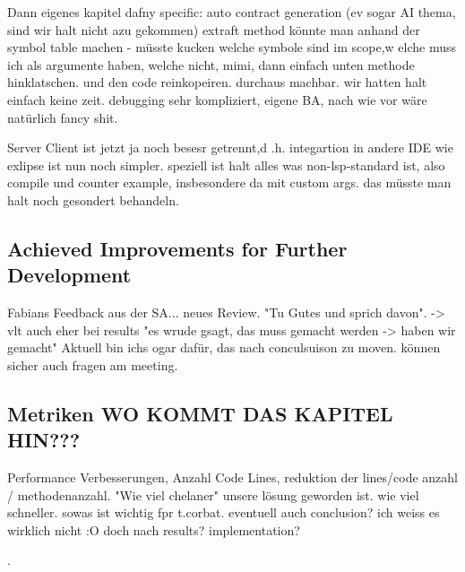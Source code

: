 Dann eigenes kapitel dafny specific:
auto contract generation (ev sogar AI thema, sind wir halt nicht azu gekommen)
extraft method könnte man anhand der symbol table machen - müsste kucken welche symbole sind im scope,w elche muss ich als argumente haben, welche nicht, mimi, dann einfach unten methode hinklatschen. und den code reinkopeiren. durchaus machbar. wir hatten halt einfach keine zeit.
debugging sehr kompliziert, eigene BA, nach wie vor wäre natürlich fancy shit.

Server Client ist jetzt ja noch besesr getrennt,d .h. integartion in andere IDE wie exlipse ist nun noch simpler. speziell ist halt alles was non-lsp-standard ist, also compile und counter example, insbesondere da mit custom args. das müsste man halt noch gesondert behandeln.






\subsection{Achieved Improvements for Further Development}
Fabians Feedback aus der SA... neues Review. "Tu Gutes und sprich davon". -> vlt auch eher bei results "es wrude gsagt, das muss gemacht werden -> haben wir gemacht"
Aktuell bin ichs ogar dafür, das nach conculsuison zu moven. können sicher auch fragen am meeting.





\subsection{Metriken WO KOMMT DAS KAPITEL HIN???}
Performance Verbesserungen, Anzahl Code Lines, reduktion der lines/code anzahl / methodenanzahl.
"Wie viel chelaner" unsere lösung geworden ist. wie viel schneller. sowas ist wichtig fpr t.corbat. 
eventuell auch conclusion? ich weiss es wirklich nicht :O doch nach results? implementation?

.